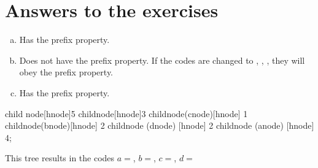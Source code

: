 \section{Answers to the exercises}

\begin{Answer}[ref={prefix-prop}]

  \begin{enumerate}[(a)]
  \item Has the prefix property.
  \item Does not have the prefix property. If the codes are changed to
    , , , 
    they will obey the prefix property.
  \item Has the prefix property.

  \end{enumerate}

\end{Answer}

\begin{Answer}[ref={nuther}]
\begin{huffmanc}

  child {node[hnode]{5}
  child{node[hnode]{3}
  child{node(cnode)[hnode] {1}}
  child{node(bnode)[hnode] {2}}}
  child{node (dnode) [hnode] {2}}}
  child{node (anode) [hnode] {4}};


\end{huffmanc}

This tree results in the codes $a=$, $b=$,
$c=$, $d=$

\end{Answer}